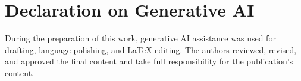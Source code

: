 \documentclass[]{ceurart}
\begin{document}
\section*{Declaration on Generative AI}
During the preparation of this work, generative AI assistance was used for drafting, language polishing, and LaTeX editing. The authors reviewed, revised, and approved the final content and take full responsibility for the publication's content.



\end{document}
